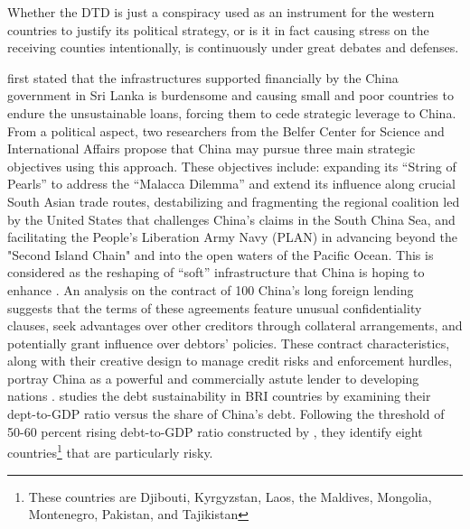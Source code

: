 Whether the DTD is just a conspiracy used as an instrument for the western countries to justify its political strategy, or is it in fact causing stress on the receiving counties intentionally, is continuously under great debates and defenses.

\citet{Chellaney_2017} first stated that the infrastructures supported financially by the China government in Sri Lanka is burdensome and causing small and poor countries to endure the unsustainable loans, forcing them to cede strategic leverage to China.
From a political aspect, 
two researchers from the Belfer Center for Science and International Affairs \citet*{Parker2018} propose that China may pursue three main strategic objectives using this approach.
These objectives include: expanding its ``String of Pearls'' to address the ``Malacca Dilemma\footnotemark{}'' and extend its influence along crucial South Asian trade routes, destabilizing and fragmenting the regional coalition led by the United States that challenges China's claims in the South China Sea, and facilitating the People's Liberation Army Navy (PLAN) in advancing beyond the "Second Island Chain" and into the open waters of the Pacific Ocean.
This is considered as the reshaping of ``soft'' infrastructure that China is hoping to enhance \citep{Jonathan-Hillman-18}.
An analysis on the contract of 100 China's long foreign lending suggests that the terms of these agreements feature unusual confidentiality clauses, seek advantages over other creditors through collateral arrangements, and potentially grant influence over debtors' policies. These contract characteristics, along with their creative design to manage credit risks and enforcement hurdles, portray China as a powerful and commercially astute lender to developing nations \citep{Gelpern-22}.
\citet*{Hurley19-8-debt-trap} studies the debt sustainability in BRI countries by examining their dept-to-GDP ratio versus the share of China's debt. Following the threshold of 50-60 percent rising debt-to-GDP ratio constructed by \citet{Chudik-15}, they identify eight
countries\footnote{
    These countries are Djibouti, Kyrgyzstan, Laos, the Maldives, Mongolia, Montenegro, Pakistan, and Tajikistan}
that are particularly risky.

